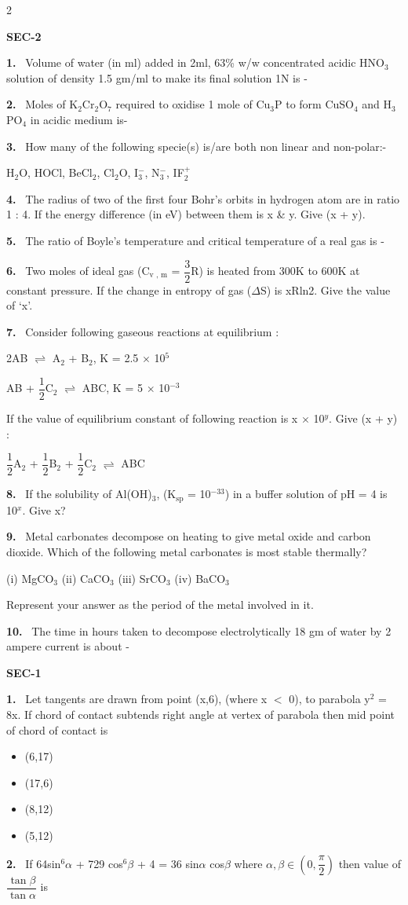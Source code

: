 \documentclass[10pt]{extarticle}
\newcommand{\partsec}[2]{\par\medskip\noindent{\large\bfseries PART-#1: #2}\par\smallskip}
\newcommand{\sect}[1]{\par\smallskip\noindent\textbf{#1}\par}
\newcommand{\qn}[1]{\par\smallskip\noindent\textbf{#1.}~}
\newenvironment{qoptions}{\begin{itemize}[leftmargin=1.8em,itemsep=1pt,topsep=2pt,label={}]}{\end{itemize}}
\newcommand{\opt}[2]{\item[(#1)] #2}
\begin{document}
\begin{multicols}{2}
\begin{qoptions}
\end{qoptions}
\sect{SEC-2}
\qn{1} Volume of water (in ml) added in 2ml, 63\% w/w concentrated acidic HNO$_3$ solution of density 1.5 gm/ml to make its final solution 1N is -
\qn{2} Moles of K$_2$Cr$_2$O$_7$ required to oxidise 1 mole of Cu$_3$P to form CuSO$_4$ and H$_3$PO$_4$ in acidic medium is-
\qn{3} How many of the following specie(s) is/are both non linear and non-polar:-\par
H$_2$O, HOCl, BeCl$_2$, Cl$_2$O, I$_3^{-}$, N$_3^{-}$, IF$_2^{+}$
\qn{4} The radius of two of the first four Bohr's orbits in hydrogen atom are in ratio 1 : 4. If the energy difference (in eV) between them is x \& y. Give (x + y).
\qn{5} The ratio of Boyle's temperature and critical temperature of a real gas is -
\qn{6} Two moles of ideal gas (C$_{\text{v , m}}$ = $\dfrac{3}{2}$R) is heated from 300K to 600K at constant pressure. If the change in entropy of gas ($\Delta$S) is xRln2. Give the value of `x'.
\qn{7} Consider following gaseous reactions at equilibrium :\par
2AB $\rightleftharpoons$ A$_2$ + B$_2$, \quad K = 2.5 $\times$ 10$^5$\par
AB + $\dfrac{1}{2}$C$_2$ $\rightleftharpoons$ ABC, K = 5 $\times$ 10$^{-3}$\par
If the value of equilibrium constant of following reaction is x $\times$ 10$^y$. Give (x + y) :\par
$\dfrac{1}{2}$A$_2$ + $\dfrac{1}{2}$B$_2$ + $\dfrac{1}{2}$C$_2$ $\rightleftharpoons$ ABC
\qn{8} If the solubility of Al(OH)$_3$, (K$_{\text{sp}}$ = 10$^{-33}$) in a buffer solution of pH = 4 is 10$^x$. Give x?
\qn{9} Metal carbonates decompose on heating to give metal oxide and carbon dioxide. Which of the following metal carbonates is most stable thermally?\par
(i) MgCO$_3$ \quad (ii) CaCO$_3$ \quad (iii) SrCO$_3$ \quad (iv) BaCO$_3$\par
Represent your answer as the period of the metal involved in it.
\qn{10} The time in hours taken to decompose electrolytically 18 gm of water by 2 ampere current is about -
\partsec{3}{MATHEMATICS}
\sect{SEC-1}
\qn{1} Let tangents are drawn from point (x,6), (where x $<$ 0), to parabola y$^2$ = 8x. If chord of contact subtends right angle at vertex of parabola then mid point of chord of contact is
\begin{qoptions}
\opt{A}{(6,17)}
\opt{B}{(17,6)}
\opt{C}{(8,12)}
\opt{D}{(5,12)}
\end{qoptions}
\qn{2} If 64sin$^6\alpha$ + 729 cos$^6\beta$ + 4 = 36 sin$\alpha$ cos$\beta$ where $\alpha,\beta \in \left(0,\dfrac{\pi}{2}\right)$ then value of $\dfrac{\tan\beta}{\tan\alpha}$ is

\end{multicols}
\end{document}
